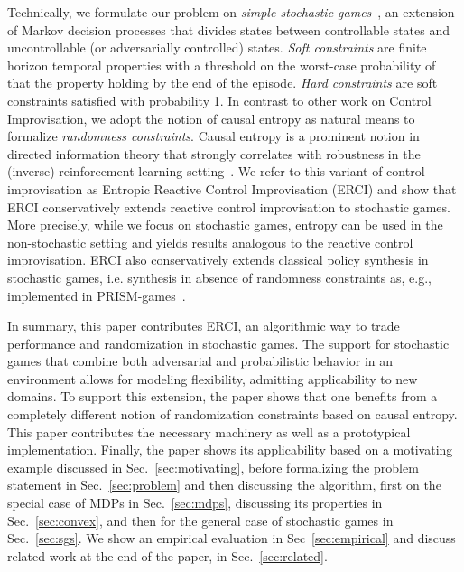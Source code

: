 Technically, we formulate our problem on \emph{simple stochastic
games}~\cite{DBLP:conf/dimacs/Condon90}, an extension of Markov decision processes that divides states
between controllable states and uncontrollable (or adversarially
controlled) states. \emph{Soft constraints} are finite horizon
temporal properties with a threshold on the worst-case probability of
that the property holding by the end of the episode. \emph{Hard
constraints} are soft constraints satisfied with probability 1. In
contrast to other work on Control Improvisation, we adopt the notion
of causal entropy as natural means to formalize \emph{randomness
constraints}.  Causal entropy is a prominent notion in directed
information theory that strongly correlates with robustness in the
(inverse) reinforcement learning setting~\cite{mceThesis,
maxEntAnswer}. We refer to this variant of control improvisation as
Entropic Reactive Control Improvisation (ERCI) and show that ERCI
conservatively extends reactive control improvisation to stochastic
games. More precisely, while we focus on stochastic games, entropy can
be used in the non-stochastic setting and yields results analogous to
the reactive control improvisation. ERCI also conservatively extends  classical policy synthesis in stochastic games, i.e. synthesis in absence of randomness constraints as, e.g., implemented in PRISM-games~\cite{DBLP:journals/sttt/KwiatkowskaPW18}.


%
In summary, this paper contributes ERCI, an algorithmic way to trade
performance and randomization in stochastic games. The support for
stochastic games that combine both adversarial and probabilistic
behavior in an environment allows for modeling flexibility,
admitting applicability to new domains. To support this extension,
the paper shows that one benefits from a completely different notion
of randomization constraints based on causal entropy.  This paper
contributes the necessary machinery as well as a prototypical
implementation. Finally, the paper shows its applicability based on a
motivating example discussed in Sec.~\ref{sec:motivating}, before
formalizing the problem statement in Sec.~\ref{sec:problem} and then
discussing the algorithm, first on the special case of MDPs in
Sec.~\ref{sec:mdps}, discussing its properties in Sec.~\ref{sec:convex}, and then for the general case of stochastic games
in Sec.~\ref{sec:sgs}.  We show an empirical evaluation in
Sec~\ref{sec:empirical} and discuss related work at the end of the
paper, in Sec.~\ref{sec:related}.



